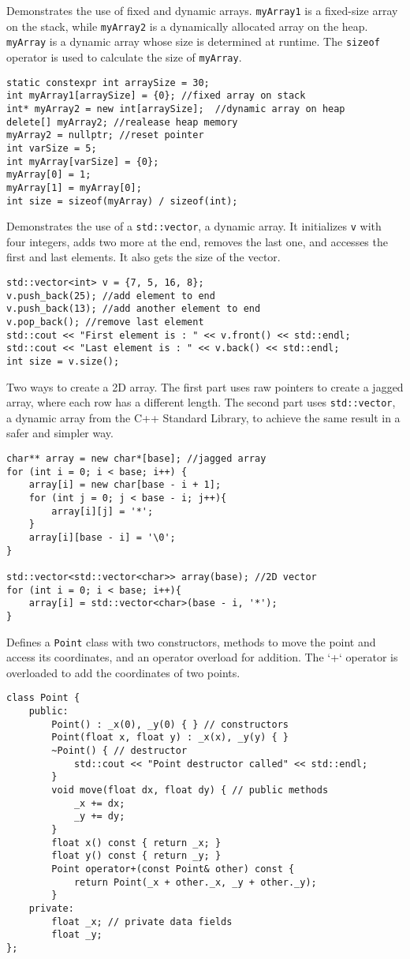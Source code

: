 Demonstrates the use of fixed and dynamic arrays. \texttt{myArray1} is a
fixed-size array on the stack, while \texttt{myArray2} is a dynamically allocated array on
the heap. \texttt{myArray} is a dynamic array whose size is determined at runtime. The
\texttt{sizeof} operator is used to calculate the size of \texttt{myArray}.
\begin{verbatim}
static constexpr int arraySize = 30;
int myArray1[arraySize] = {0}; //fixed array on stack
int* myArray2 = new int[arraySize];  //dynamic array on heap
delete[] myArray2; //realease heap memory
myArray2 = nullptr; //reset pointer
int varSize = 5;
int myArray[varSize] = {0};
myArray[0] = 1;
myArray[1] = myArray[0];
int size = sizeof(myArray) / sizeof(int);
\end{verbatim}

Demonstrates the use of a \texttt{std::vector}, a dynamic array. It initializes
\texttt{v} with four integers, adds two more at the end, removes the last one, and accesses the
first and last elements. It also gets the size of the vector.
\begin{verbatim}
std::vector<int> v = {7, 5, 16, 8};
v.push_back(25); //add element to end
v.push_back(13); //add another element to end
v.pop_back(); //remove last element
std::cout << "First element is : " << v.front() << std::endl;
std::cout << "Last element is : " << v.back() << std::endl;
int size = v.size();
\end{verbatim}

Two ways to create a 2D array. The first part uses raw pointers to create
a jagged array, where each row has a different length. The second part uses \texttt{std::vector},
a dynamic array from the C++ Standard Library, to achieve the same result in a safer and simpler way.
\begin{verbatim}
char** array = new char*[base]; //jagged array
for (int i = 0; i < base; i++) {
    array[i] = new char[base - i + 1];
    for (int j = 0; j < base - i; j++){
        array[i][j] = '*';
    }
    array[i][base - i] = '\0';
}

std::vector<std::vector<char>> array(base); //2D vector
for (int i = 0; i < base; i++){
    array[i] = std::vector<char>(base - i, '*');
}
\end{verbatim}

Defines a \texttt{Point} class with two constructors, methods to move the point and
access its coordinates, and an operator overload for addition. The `+` operator is overloaded to
add the coordinates of two points.
\begin{verbatim}
class Point {
    public:
        Point() : _x(0), _y(0) { } // constructors
        Point(float x, float y) : _x(x), _y(y) { }
        ~Point() { // destructor
            std::cout << "Point destructor called" << std::endl;
        }
        void move(float dx, float dy) { // public methods
            _x += dx;
            _y += dy;
        }
        float x() const { return _x; }
        float y() const { return _y; }
        Point operator+(const Point& other) const {
            return Point(_x + other._x, _y + other._y);
        }
    private:
        float _x; // private data fields
        float _y;
};
\end{verbatim}

